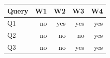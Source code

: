 \begin{tabular}{@{}lrrrr@{}}
\toprule
Query & W1 & W2 & W3 & W4\\
\midrule
Q1 & no & yes & yes & yes\\
Q2 & no & no & no & yes\\
Q3 & no & no & yes & yes\\
\bottomrule
\end{tabular}
